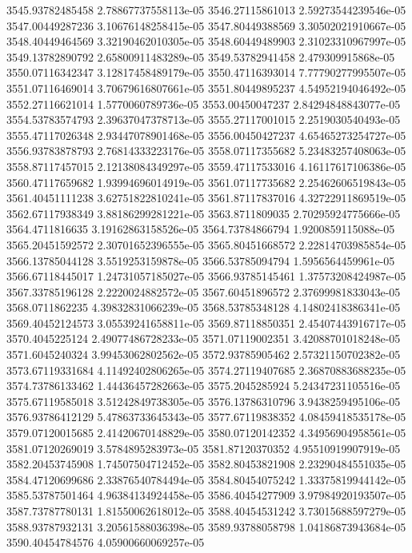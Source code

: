 {3545.93782485458 2.78867737558113e-05
3546.27115861013 2.59273544239546e-05
3547.00449287236 3.10676148258415e-05
3547.80449388569 3.30502021910667e-05
3548.40449464569 3.32190462010305e-05
3548.60449489903 2.31023310967997e-05
3549.13782890792 2.65800911483289e-05
3549.53782941458 2.479309915868e-05
3550.07116342347 3.12817458489179e-05
3550.47116393014 7.77790277995507e-05
3551.07116469014 3.70679616807661e-05
3551.80449895237 4.54952194046492e-05
3552.27116621014 1.5770060789736e-05
3553.00450047237 2.84294848843077e-05
3554.53783574793 2.39637047378713e-05
3555.27117001015 2.2519030540493e-05
3555.47117026348 2.93447078901468e-05
3556.00450427237 4.65465273254727e-05
3556.93783878793 2.76814333223176e-05
3558.07117355682 5.23483257408063e-05
3558.87117457015 2.12138084349297e-05
3559.47117533016 4.16117617106386e-05
3560.47117659682 1.93994696014919e-05
3561.07117735682 2.25462606519843e-05
3561.40451111238 3.62751822810241e-05
3561.87117837016 4.32722911869519e-05
3562.67117938349 3.88186299281221e-05
3563.8711809035 2.70295924775666e-05
3564.4711816635 3.19162863158526e-05
3564.73784866794 1.9200859115088e-05
3565.20451592572 2.30701652396555e-05
3565.80451668572 2.22814703985854e-05
3566.13785044128 3.5519253159878e-05
3566.53785094794 1.5956564459961e-05
3566.67118445017 1.24731057185027e-05
3566.93785145461 1.37573208424987e-05
3567.33785196128 2.2220024882572e-05
3567.60451896572 2.37699981833043e-05
3568.0711862235 4.39832831066239e-05
3568.53785348128 4.14802418386341e-05
3569.40452124573 3.05539241658811e-05
3569.87118850351 2.45407443916717e-05
3570.4045225124 2.49077486728233e-05
3571.07119002351 3.42088701018248e-05
3571.6045240324 3.99453062802562e-05
3572.93785905462 2.57321150702382e-05
3573.67119331684 4.11492402806265e-05
3574.27119407685 2.36870883688235e-05
3574.73786133462 1.44436457282663e-05
3575.2045285924 5.24347231105516e-05
3575.67119585018 3.51242849738305e-05
3576.13786310796 3.9438259495106e-05
3576.93786412129 5.47863733645343e-05
3577.67119838352 4.08459418535178e-05
3579.07120015685 2.41420670148829e-05
3580.07120142352 4.34956904958561e-05
3581.07120269019 3.5784895283973e-05
3581.87120370352 4.95510919907919e-05
3582.20453745908 1.74507504712452e-05
3582.80453821908 2.23290484551035e-05
3584.47120699686 2.33876540784494e-05
3584.80454075242 1.33375819944142e-05
3585.53787501464 4.96384134924458e-05
3586.40454277909 3.97984920193507e-05
3587.73787780131 1.81550062618012e-05
3588.40454531242 3.73015688597279e-05
3588.93787932131 3.20561588036398e-05
3589.93788058798 1.04186873943684e-05
3590.40454784576 4.05900660069257e-05
}
